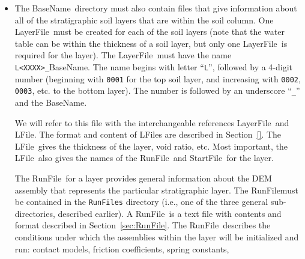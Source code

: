 \documentclass[letterpaper,11pt]{article}
\newcommand{\RunFile}{\textsf{RunFile}}
\newcommand{\StartFile}{\textsf{StartFile}}
\newcommand{\BaseName}{\textsf{BaseName}}
\newcommand{\ColumnFile}{\textsf{ColumnFile}}
\newcommand{\LayerFile}{\textsf{LayerFile}}
\newcommand{\GFile}{\textsf{GFile}}
\newcommand{\LFile}{\textsf{LFile}}
\begin{document}
\begin{itemize}
\begin{itemize}
        water depth, etc.
        This \ColumnFile\ must have the name
        \texttt{G}\BaseName\texttt{<suffix>}, noting the
        ``\texttt{G}'' prefix.
        As such, we refer to this file with the interchangeable
        references \ColumnFile\ and \GFile.
        The format and content of \GFile s are described
        in Section~\ref{}.
        The name of the \GFile\ can include an optional prefix
        (several simulations can be run with the same
        \BaseName\ and input motion, but can differ by the
        pore fluid saturation, and these variations can be
        distinguished with the suffix.  See Section~\ref{}).
      \item
        The \BaseName\ directory must also contain files that
        give information about all of the stratigraphic soil
        layers that are within the soil column.
        One \LayerFile\ must be created for each of the soil
        layers
        (note that the water table can be within the thickness
        of a soil layer, but only one \LayerFile\ is required
        for the layer).
        The \LayerFile\ must have the name
        \texttt{L<XXXX>\_}\BaseName.
        The name begins with letter ``\texttt{L}'',
        followed by a 4-digit number
        (beginning with \texttt{0001} for the top soil layer,
        and increasing with \texttt{0002}, \texttt{0003}, etc.
        to the bottom layer).
        The number is followed by an underscore ``\texttt{\_}''
        and the \BaseName.
        \par
        We will refer to this file with the interchangeable
        references \LayerFile\ and \LFile.
        The format and content of \LFile s are described
        in Section~\ref{}.
        The \LFile\ gives the thickness of the layer,
        void ratio, etc.
        Most important, the \LFile\ also gives the names of the
        \RunFile\ and \StartFile\ for the layer.
        \par
        The \RunFile\ for a layer
        provides general information about the
        DEM assembly that represents the particular stratigraphic
        layer.
        The \RunFile must be contained in the \texttt{RunFiles}
        directory (i.e., one of the three general sub-directories,
        described earlier).
        A \RunFile\ is a text file with
        contents and format described in Section~\ref{sec:RunFile}.
        The \RunFile\ describes
        the conditions under which the
        assemblies within the layer will be initialized
        and run:
        contact models,
        friction coefficients, spring constants,

\end{itemize}
\end{itemize}
\end{document}

